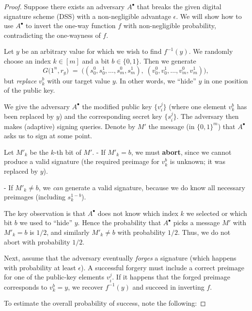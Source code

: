 \begin{proof}
  Suppose there exists an adversary \(A^\bullet\) that breaks the given digital signature scheme (DSS) with a non-negligible advantage \(\epsilon\). We will show how to use \(A^\bullet\) to invert the one-way function \(f\) with non-negligible probability, contradicting the one-wayness of \(f\).

  Let \(y\) be an arbitrary value for which we wish to find \(f^{-1}(y)\). We randomly choose an index \(k \in [m]\) and a bit \(b \in \{0,1\}\). Then we generate 
  \[
    G\bigl(1^{n}, r_g\bigr) 
    \;=\; 
    \bigl( (s^{0}_{0}, s^{1}_{0}, \dots, s^{0}_{m}, s^{1}_{m}),\;
           (v^{0}_{0}, v^{1}_{0}, \dots, v^{0}_{m}, v^{1}_{m}) \bigr),
  \]
  but \emph{replace} \(v_{k}^{b}\) with our target value \(y\). In other words, we “hide” \(y\) in one position of the public key.

  We give the adversary \(A^\bullet\) the modified public key \(\{v_{i}^{j}\}\) (where one element \(v_{k}^{b}\) has been replaced by \(y\)) and the corresponding secret key \(\{s_{i}^{j}\}\). The adversary then makes (adaptive) signing queries. Denote by \(M'\) the message (in \(\{0,1\}^m\)) that \(A^\bullet\) asks us to sign at some point.

  Let \(M'_k\) be the \(k\)-th bit of \(M'\).
  - If \(M'_k = b\), we must \textbf{abort}, since we cannot produce a valid signature (the required preimage for \(v_{k}^{b}\) is unknown; it was replaced by \(y\)).
  
  - If \(M'_k \neq b\), we \emph{can} generate a valid signature, because we do know all necessary preimages (including \(s_{k}^{1-b}\)).

  The key observation is that \(A^\bullet\) does not know which index \(k\) we selected or which bit \(b\) we used to “hide” \(y\). Hence the probability that \(A^\bullet\) picks a message \(M'\) with \(M'_k = b\) is \(1/2\), and similarly \(M'_k \neq b\) with probability \(1/2\). Thus, we do not abort with probability \(1/2\).

  Next, assume that the adversary eventually \emph{forges} a signature (which happens with probability at least \(\epsilon\)). A successful forgery must include a correct preimage for one of the public-key elements \(v_{i}^{j}\). If it happens that the forged preimage corresponds to \(v_{k}^{b} = y\), we recover \(f^{-1}(y)\) and succeed in inverting \(f\).

  To estimate the overall probability of success, note the following:


\end{proof}
